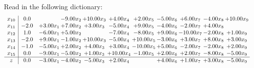 \documentclass[9pt]{article}
\begin{document}
Read in the following dictionary:
\[\begin{array}{c| c c@{\hskip 2pt} c@{\hskip 2pt} c@{\hskip 2pt} c@{\hskip 2pt} c@{\hskip 2pt} c@{\hskip 2pt} c@{\hskip 2pt} c@{\hskip 2pt} c@{\hskip 2pt} }
 x_{10}   &  0.0  &   & -9.00 x_{2} & + 10.00 x_{3} & +  4.00 x_{4} & +  2.00 x_{5} & -5.00 x_{6} & +  6.00 x_{7} & -4.00 x_{8} & + 10.00 x_{9}\\
 x_{11}   &  -2.0 & +  3.00 x_{1} & +  7.00 x_{2} & +  3.00 x_{3} & -5.00 x_{4} & +  9.00 x_{5} & -4.00 x_{6} & -2.00 x_{7} & +  4.00 x_{8} &   \\
 x_{12}   &  1.0 & -6.00 x_{1} & +  5.00 x_{2} &   & -7.00 x_{4} & -8.00 x_{5} & +  9.00 x_{6} & -10.00 x_{7} & -2.00 x_{8} & +  1.00 x_{9}\\
 x_{13}   &  -2.0 & +  9.00 x_{1} & -1.00 x_{2} & + 10.00 x_{3} & -5.00 x_{4} & + 10.00 x_{5} & -3.00 x_{6} & +  3.00 x_{7} & +  8.00 x_{8} & +  3.00 x_{9}\\
 x_{14}   &  -1.0 & -5.00 x_{1} & +  2.00 x_{2} & +  4.00 x_{3} & +  3.00 x_{4} & -10.00 x_{5} & +  5.00 x_{6} & -2.00 x_{7} & -2.00 x_{8} & +  2.00 x_{9}\\
 x_{15}   &  0.0 & -9.00 x_{1} & -5.00 x_{2} & +  1.00 x_{3} & + 10.00 x_{4} & -1.00 x_{5} & +  2.00 x_{6} & +  2.00 x_{7} & -8.00 x_{8} & -5.00 x_{9}\\
\hline
z    &  0.0 & -3.00 x_{1} & -4.00 x_{2} & -5.00 x_{3} & +  2.00 x_{4} &   & +  4.00 x_{6} & +  1.00 x_{7} & +  3.00 x_{8} & -5.00 x_{9}\\
\end{array}\]
\end{document}
